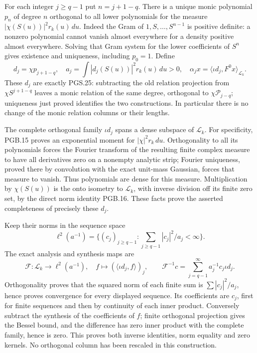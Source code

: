 For each integer $j\geq q-1$ put $n=j+1-q$. There is a unique monic
polynomial $p_n$ of degree $n$ orthogonal to all lower polynomials
for the measure $|\chi(S(u))|^2r_k(u)\,du$. Indeed the Gram of
$1,S,\ldots,S^{n-1}$ is positive definite: a nonzero polynomial
cannot vanish almost everywhere for a density positive almost
everywhere. Solving that Gram system for the lower coefficients of
$S^n$ gives existence and uniqueness, including $p_0=1$. Define
\[
 d_j=\chi p_{j+1-q},\quad
 a_j=\int|d_j(S(u))|^2r_k(u)\,du>0,\quad
 \alpha_jx=\langle\iota d_j,F^0x\rangle_{\mathscr L_k}.
\tag{PGRT.3}\label{eq:pgrt-relation-coefficients}
\]
These $d_j$ are exactly PGS.25: subtracting the old relation
projection from $\chi S^{j+1-q}$ leaves a monic relation of the
same degree, orthogonal to $\chi\mathcal P_{j-q}$; uniqueness
just proved identifies the two constructions. In particular
there is no change of the monic relation columns or their lengths.

The complete orthogonal family $\iota d_j$ spans a dense subspace
of $\mathscr L_k$. For specificity, PGB.15 proves an exponential
moment for $|\chi|^2r_k\,du$. Orthogonality to all its polynomials
forces the Fourier transform of the resulting finite complex
measure to have all derivatives zero on a nonempty analytic strip;
Fourier uniqueness, proved there by convolution with the exact
unit-mass Gaussian, forces that measure to vanish. Thus polynomials
are dense for this measure. Multiplication by $\chi(S(u))$ is
the onto isometry to $\mathscr L_k$, with inverse division off
its finite zero set, by the direct norm identity PGB.16. These
facts prove the asserted completeness of precisely these $d_j$.

Keep their norms in the sequence space
\[
 \ell^2(a^{-1})=
 \{(c_j)_{j\geq q-1}:\sum_{j\geq q-1}|c_j|^2/a_j<\infty\}.
\]
The exact analysis and synthesis maps are
\[
 \mathcal F:\mathscr L_k\longrightarrow\ell^2(a^{-1}),
 \quad f\longmapsto(\langle\iota d_j,f\rangle)_j,
 \qquad
 \mathcal F^{-1}c=\sum_{j=q-1}^{\infty}a_j^{-1}c_j\iota d_j.
\tag{PGRT.4}\label{eq:pgrt-analysis}
\]
Orthogonality proves that the squared norm of each finite sum is
$\sum|c_j|^2/a_j$, hence proves convergence for every displayed
sequence. Its coefficients are $c_j$, first for finite sequences
and then by continuity of each inner product. Conversely subtract
the synthesis of the coefficients of $f$; finite orthogonal
projection gives the Bessel bound, and the difference has zero
inner product with the complete family, hence is zero. This proves
both inverse identities, norm equality and zero kernels. No
orthogonal column has been rescaled in this construction.

